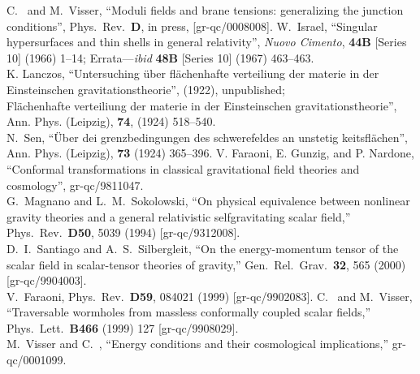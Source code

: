 \documentclass[a4paper,10pt]{article}
\begin{document}
\begin{thebibliography}{99}
C.~{\Barcelo} and M.~Visser,
``Moduli fields and brane tensions: generalizing the junction conditions'',
Phys.\ Rev.\  {\bf D}, in press,
[gr-qc/0008008].
W.~Israel,
``Singular hypersurfaces and thin shells in general relativity'',
{\em Nuovo Cimento}, {\bf 44B} [Series 10] (1966) 1--14; 
Errata---{\em ibid} {\bf 48B} [Series 10] (1967) 463--463.
\\
K. Lanczos,
``Untersuching \"uber fl\"achenhafte verteiliung der materie in der 
Einsteinschen gravitationstheorie'', (1922), unpublished;
\\
Fl\"achenhafte verteiliung der materie in der Einsteinschen gravitationstheorie'', 
Ann. Phys. (Leipzig), {\bf 74}, (1924) 518--540.
\\
N.~Sen, 
``\"Uber dei grenzbedingungen des schwerefeldes an unstetig keitsfl\"achen'',
Ann. Phys. (Leipzig), {\bf 73} (1924) 365--396.
V. Faraoni, E. Gunzig, and P. Nardone, 
``Conformal transformations in classical gravitational field theories
 and cosmology'', gr-qc/9811047.
\\
G.~Magnano and L.~M.~Sokolowski,
``On physical equivalence between nonlinear gravity theories 
and a general relativistic selfgravitating scalar field,''
Phys.\ Rev.\  {\bf D50}, 5039 (1994)
[gr-qc/9312008].
\\
D.~I.~Santiago and A.~S.~Silbergleit,
``On the energy-momentum tensor of the scalar field in scalar-tensor 
theories of gravity,''
Gen.\ Rel.\ Grav.\  {\bf 32}, 565 (2000)
[gr-qc/9904003].
\\
V.~Faraoni,
Phys.\ Rev.\  {\bf D59}, 084021 (1999)
[gr-qc/9902083].
C.~{\Barcelo} and M.~Visser,
``Traversable wormholes from massless conformally coupled scalar fields,''
Phys.\ Lett.\  {\bf B466} (1999) 127
[gr-qc/9908029].
\\
M.~Visser and C.~{\Barcelo},
``Energy conditions and their cosmological implications,''
gr-qc/0001099.

\end{thebibliography}
\end{document}

